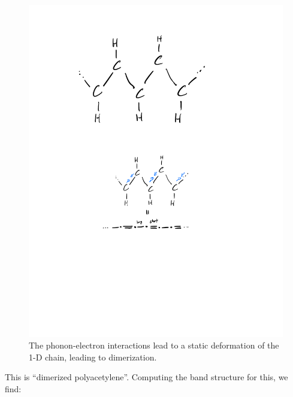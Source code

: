 \begin{figure}[htbp]
    \centering
    \includegraphics[scale=0.7]{Images/fig-polyacedimerization.pdf}
    \caption{The phonon-electron interactions lead to a static deformation of the 1-D chain, leading to dimerization.}
    \label{fig-polyacedimerization}
\end{figure}

This is ``dimerized polyacetylene''. Computing the band structure for this, we find:

